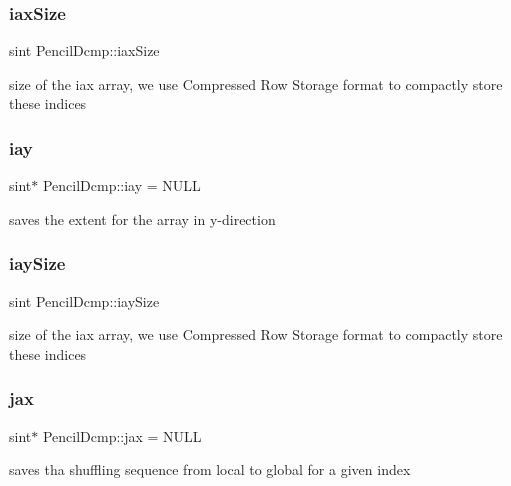 \subsubsection{\texorpdfstring{iax\+Size}{iaxSize}}
{\footnotesize\ttfamily sint Pencil\+Dcmp\+::iax\+Size\hspace{0.3cm}{\ttfamily [protected]}}

size of the iax array, we use Compressed Row Storage format to compactly store these indices \mbox{\label{classPencilDcmp_ab18c2646b8ccdaa7dc2db95ef4fc7bf3}} 
\subsubsection{\texorpdfstring{iay}{iay}}
{\footnotesize\ttfamily sint$\ast$ Pencil\+Dcmp\+::iay = N\+U\+LL\hspace{0.3cm}{\ttfamily [protected]}}

saves the extent for the array in y-\/direction \mbox{\label{classPencilDcmp_a33d1d485a59cc727f9f4136d093874f2}} 
\subsubsection{\texorpdfstring{iay\+Size}{iaySize}}
{\footnotesize\ttfamily sint Pencil\+Dcmp\+::iay\+Size\hspace{0.3cm}{\ttfamily [protected]}}

size of the iax array, we use Compressed Row Storage format to compactly store these indices \mbox{\label{classPencilDcmp_ae7816023aee42122b16ab8a0d885b03f}} 
\subsubsection{\texorpdfstring{jax}{jax}}
{\footnotesize\ttfamily sint$\ast$ Pencil\+Dcmp\+::jax = N\+U\+LL\hspace{0.3cm}{\ttfamily [protected]}}

saves tha shuffling sequence from local to global for a given index \mbox{\label{classPencilDcmp_abdef25617d6bf992f58e2d8676e42024}} 
